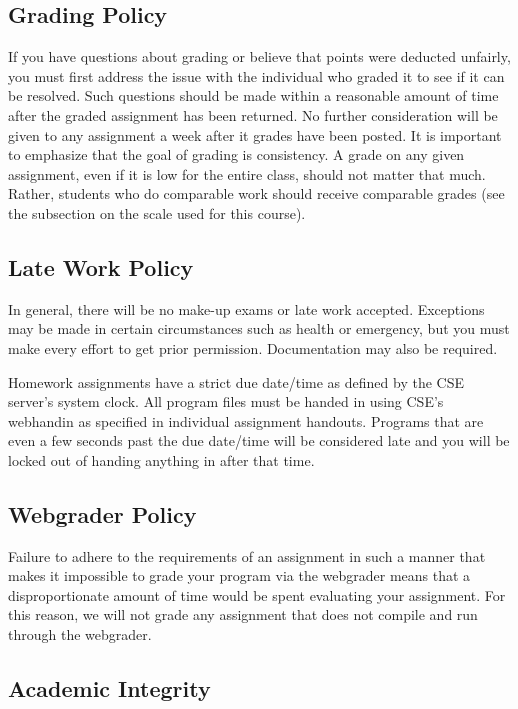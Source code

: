\documentclass[12pt]{scrartcl}
\begin{document}
\subsection{Grading Policy}

If you have questions about grading or believe that points were 
deducted unfairly, you must first address the issue with the 
individual who graded it to see if it can be resolved.  Such 
questions should be made within a reasonable amount of time 
after the graded assignment has been returned.  No further 
consideration will be given to any assignment a week after 
it grades have been posted.  It is important to emphasize that 
the goal of grading is consistency.  A grade on any given 
assignment, even if it is low for the entire class, should 
not matter that much.  Rather, students who do comparable 
work should receive comparable grades (see the subsection 
on the scale used for this course).

\subsection{Late Work Policy}

In general, there will be no make-up exams or late work
accepted.  Exceptions may be made in certain circumstances 
such as health or emergency, but you must make every effort 
to get prior permission.  Documentation may also be required.

Homework assignments have a strict due date/time as defined by
the CSE server's system clock.  All program files must be handed
in using CSE's webhandin as specified in individual assignment
handouts.  Programs that are even a few seconds past the due 
date/time will be considered late and you will be locked out
of handing anything in after that time.  

\subsection{Webgrader Policy}

Failure to adhere to the requirements of an assignment in such 
a manner that makes it impossible to grade your program via 
the webgrader means that a disproportionate amount of time 
would be spent evaluating your assignment.  For this reason, 
we will not grade any assignment that does not compile and 
run through the webgrader.  

\subsection{Academic Integrity}
\end{document}
